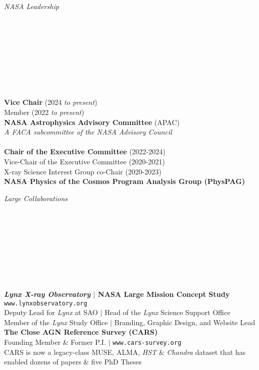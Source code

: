 \documentclass[11pt]{article}
\begin{document}
\hspace{2.5mm} \parbox{1.5in}{\textit{NASA Leadership}\\\\\\\\\\\\\\\\\\} \parbox{5.15in}{\textbf{Vice Chair} (2024 \textit{to present}) \\Member (2022 \textit{to present}) \\ \textbf{NASA Astrophysics Advisory Committee} (APAC)\\\textit{A FACA subcommittee of the NASA Advisory Council} \\\\\textbf{Chair of the Executive Committee} (2022-2024) \\ Vice-Chair of the Executive Committee (2020-2021) \\ X-ray Science Interest Group co-Chair (2020-2023) \\ \textbf{NASA Physics of the Cosmos Program Analysis Group (PhysPAG)}\\
}


\hspace{2.5mm} \parbox{1.5in}{\textit{Large Collaborations \\\\\\\\\\\\\\\\\\}} \parbox{5.15in}{\textbf{\textit{Lynx X-ray Observatory} $|$ NASA Large Mission Concept Study} \\
\texttt{www.lynxobservatory.org} \\ Deputy Lead for \textit{Lynx} at SAO $|$ Head of the \textit{Lynx} Science Support Office \\ Member of the \textit{Lynx} Study Office $|$ Branding, Graphic Design, and Website Lead \\




\textbf{The Close AGN Reference Survey (CARS)} \\ Founding Member \& Former P.I. $|$ \texttt{www.cars-survey.org} \\ CARS is now a legacy-class MUSE, ALMA, \textit{HST} \& \textit{Chandra} dataset that has enabled dozens of papers \& five PhD Theses \\
}
\end{document}
